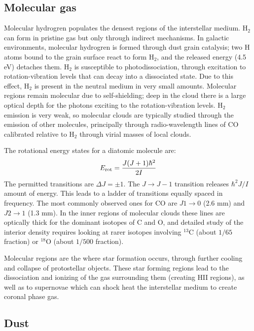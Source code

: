 \subsection{Molecular gas}

Molecular hydrogren populates the densest regions of the interstellar
medium. H$_2$ can form in pristine gas but only through indirect
mechanisms. In galactic environments, molecular hydrogren is formed
through dust grain catalysis; two H atoms bound to the grain surface
react to form H$_2$, and the released energy (4.5 eV) detaches
them. H$_2$ is susceptible to photodissociation, through excitation to
rotation-vibration levels that can decay into a dissociated state. Due
to this effect, H$_2$ is present in the neutral medium in very small
amounts. Molecular regions remain molecular due to self-shielding;
deep in the cloud there is a large optical depth for the photons
exciting to the rotation-vibration levels. H$_2$ emission is very
weak, so molecular clouds are typically studied through the emission
of other molecules, principally through radio-wavelength lines of CO
calibrated relative to H$_2$ through virial masses of local clouds.

The rotational energy states for a diatomic molecule are:
\begin{equation}
E_{\rm rot} = \frac{J(J+1) \hbar^2}{2I}
\end{equation}
The permitted transitions are $\Delta J = \pm 1$. The $J\rightarrow
J-1$ transition releases $\hbar^2J/I$ amount of energy. This leads to
a ladder of transitions equally spaced in frequency. The most commonly
observed ones for CO are $J1\rightarrow 0$ (2.6 mm) and $J2\rightarrow
1$ (1.3 mm). In the inner regions of molecular clouds these lines are
optically thick for the dominant isotopes of C and O, and detailed
study of the interior density requires looking at rarer isotopes
involving ${}^{13}$C (about $1/65$ fraction) or ${}^{18}$O (about
$1/500$ fraction).

Molecular regions are the where star formation occurs, through further
cooling and collapse of protostellar objects. These star forming
regions lead to the dissociation and ionizing of the gas surrounding
them (creating HII regions), as well as to supernovae which can shock
heat the interstellar medium to create coronal phase gas.

\subsection{Dust}


